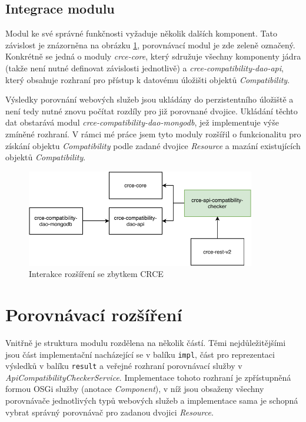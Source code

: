 \documentclass[czech,DP]{thesiskiv}
\begin{document}
\subsection{Integrace modulu}

Modul ke své správné funkčnosti vyžaduje několik dalších komponent. Tato závislost je znázorněna na obrázku \ref{fig:apicomp-crce-interaction}, porovnávací modul je zde zeleně označený. Konkrétně se jedná o moduly \textit{crce-core}, který sdružuje všechny komponenty jádra (takže není nutné definovat závislosti jednotlivě) a \textit{crce-compatibility-dao-api}, který obsahuje rozhraní pro přístup k datovému úložišti objektů \textit{Compatibility}. 

Výsledky porovnání webových služeb jsou ukládány do perzistentního úložiště a není tedy nutné znovu počítat rozdíly pro již porovnané dvojice. Ukládání těchto dat obstarává modul \textit{crce-compatibility-dao-mongodb}, jež implementuje výše  zmíněné rozhraní. V rámci mé práce jsem tyto moduly rozšířil o funkcionalitu pro získání objektu \textit{Compatibility} podle zadané dvojice \textit{Resource} a mazání existujících objektů \textit{Compatibility}.

\begin{figure}[h]
	\centering
	\includegraphics[width=10cm]{module-integration}
	\caption{Interakce rozšíření se zbytkem CRCE}
	\label{fig:apicomp-crce-interaction}
\end{figure}

\section{Porovnávací rozšíření}

Vnitřně je struktura modulu rozdělena na několik částí. Těmi nejdůležitějšími jsou část implementační nacházející se v balíku \verb|impl|, část pro reprezentaci výsledků v balíku \verb|result| a veřejné rozhraní porovnávací služby v \textit{ApiCompatibilityCheckerService}. Implementace tohoto rozhraní je zpřístupněná formou OSGi služby (anotace \textit{Component}), v níž jsou obsaženy všechny porovnávače jednotlivých typů webových služeb a implementace sama je schopná vybrat správný porovnávač pro zadanou dvojici \textit{Resource}.
\end{document}
